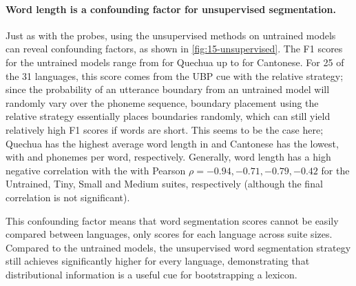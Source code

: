 

\paragraph{Word length is a confounding factor for unsupervised segmentation.}
Just as with the probes, using the unsupervised methods on untrained models can reveal confounding factors, as shown in \cref{fig:15-unsupervised}. The F1 scores for the untrained models range from  for Quechua up to  for Cantonese. For 25 of the 31 languages, this score comes from the UBP cue with the relative strategy; since the probability of an utterance boundary from an untrained model will randomly vary over the phoneme sequence, boundary placement using the relative strategy essentially places boundaries randomly, which can still yield relatively high F1 scores if words are short. This seems to be the case here; Quechua has the highest average word length in \ipachildes and Cantonese has the lowest, with  and  phonemes per word, respectively. Generally, word length has a high negative correlation with the \fscores with Pearson $\rho = -0.94, -0.71, -0.79, -0.42$ for the Untrained, Tiny, Small and Medium suites, respectively (although the final correlation is not significant). 

This confounding factor means that word segmentation scores cannot be easily compared between languages, only scores for each language across suite sizes. Compared to the untrained models, the unsupervised word segmentation strategy still achieves significantly higher \fscores for every language, demonstrating that distributional information is a useful cue for bootstrapping a lexicon. 

